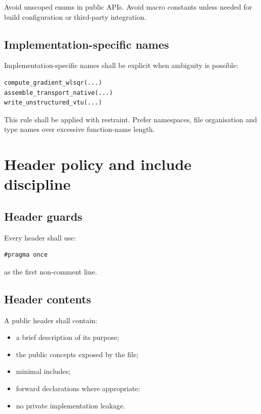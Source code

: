 \documentclass[11pt,a4paper]{article}
\begin{document}
Avoid unscoped enums in public APIs. Avoid macro constants unless needed for build configuration or third-party integration.

\subsection{Implementation-specific names}

Implementation-specific names shall be explicit when ambiguity is possible:

\begin{lstlisting}[style=mohidcpp]
compute_gradient_wlsqr(...)
assemble_transport_native(...)
write_unstructured_vtu(...)
\end{lstlisting}

This rule shall be applied with restraint. Prefer namespaces, file organisation and type names over excessive function-name length.

\section{Header policy and include discipline}

\subsection{Header guards}

Every header shall use:

\begin{lstlisting}[style=mohidcpp]
#pragma once
\end{lstlisting}

as the first non-comment line.

\subsection{Header contents}

A public header shall contain:

\begin{itemize}
  \item a brief description of its purpose;
  \item the public concepts exposed by the file;
  \item minimal includes;
  \item forward declarations where appropriate;
  \item no private implementation leakage.
\end{itemize}
\end{document}
